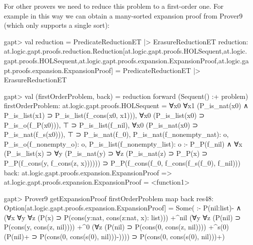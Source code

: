 \documentclass[a4paper,11pt]{article}
\begin{document}
For other provers we need to reduce this problem to a first-order one.  For
example in this way we can obtain a many-sorted expansion proof from Prover9
(which only supports a single sort):
\begin{clilisting}
gapt> val reduction = PredicateReductionET |> ErasureReductionET
reduction: at.logic.gapt.proofs.reduction.Reduction[at.logic.gapt.proofs.HOLSequent,at.logic.gapt.proofs.HOLSequent,at.logic.gapt.proofs.expansion.ExpansionProof,at.logic.gapt.proofs.expansion.ExpansionProof] = PredicateReductionET |> ErasureReductionET

gapt> val (firstOrderProblem, back) = reduction forward (Sequent() :+ problem)
firstOrderProblem: at.logic.gapt.proofs.HOLSequent =
∀x0 ∀x1 (P_is_nat(x0) ∧ P_is_list(x1) ⊃ P_is_list(f_cons(x0, x1))),
∀x0 (P_is_list(x0) ⊃ P_is_o(f_P(x0))),
⊤ ⊃ P_is_list(f_nil),
∀x0 (P_is_nat(x0) ⊃ P_is_nat(f_s(x0))),
⊤ ⊃ P_is_nat(f_0),
P_is_nat(f_nonempty_nat): o,
P_is_o(f_nonempty_o): o,
P_is_list(f_nonempty_list): o
:-
P_P(f_nil) ∧
    ∀x (P_is_list(x) ⊃
        ∀y (P_is_nat(y) ⊃
            ∀z (P_is_nat(z) ⊃ P_P(x) ⊃ P_P(f_cons(y, f_cons(z, x)))))) ⊃
  P_P(f_cons(f_0, f_cons(f_s(f_0), f_nil)))
back: at.logic.gapt.proofs.expansion.ExpansionProof => at.logic.gapt.proofs.expansion.ExpansionProof = <function1>

gapt> Prover9 getExpansionProof firstOrderProblem map back
res48: Option[at.logic.gapt.proofs.expansion.ExpansionProof] =
Some(
:-
P(nil:list)- ∧
    (∀x ∀y ∀z (P(x) ⊃ P(cons(y:nat, cons(z:nat, x): list)))
      +^{nil}
        (∀y ∀z (P(nil) ⊃ P(cons(y, cons(z, nil))))
          +^{0}
            (∀z (P(nil) ⊃ P(cons(0, cons(z, nil))))
            +^{s(0)} (P(nil)+ ⊃ P(cons(0, cons(s(0), nil)))-)))) ⊃
  P(cons(0, cons(s(0), nil)))+)

\end{clilisting}
\end{document}
